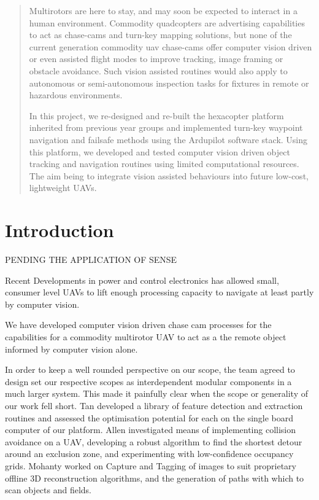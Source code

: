 \documentclass{article}
\begin{document}
  

  \begin{abstract}
  Multirotors are here to stay, and may soon be expected to interact in a human environment.
  Commodity quadcopters are advertising capabilities to act as  chase-cams and turn-key mapping solutions, but none of the current generation commodity uav chase-cams offer computer vision driven or even assisted flight modes to improve tracking, image framing or obstacle avoidance.  Such vision assisted routines would also apply to autonomous or semi-autonomous inspection tasks for fixtures in remote or hazardous environments.

  In this project, we re-designed and re-built the hexacopter platform inherited from previous year groups and implemented turn-key waypoint navigation and failsafe methods using the Ardupilot software stack.
  Using this platform, we developed and tested computer vision driven object tracking and navigation routines using limited computational resources. The aim  being to integrate vision assisted behaviours into future low-cost, lightweight UAVs.
  \end{abstract}
  \pagebreak
  \tableofcontents
  \pagebreak
  \section{Introduction}
    PENDING THE APPLICATION OF SENSE
    
    Recent Developments in power and control electronics has allowed small, consumer level UAVs to lift enough processing capacity to navigate at least partly by computer vision.


    We have developed computer vision driven chase cam processes for the 
     capabilities for a commodity multirotor UAV to act as a 
     the remote object informed by computer vision alone.

    In order to keep a well rounded perspective on our scope, the team agreed to design set our respective scopes as interdependent modular components in a much larger system.  This made it painfully clear when the scope or generality of our work fell short.
    Tan \cite{Tan} developed a library of feature detection and extraction routines and assessed the optimisation potential for each on the single board computer of our platform.
    Allen \cite{Allen} investigated means of implementing collision avoidance on a UAV, developing a robust algorithm to find the shortest detour around an exclusion zone, and experimenting with low-confidence occupancy grids.
    Mohanty \cite{Mohanty} worked on Capture and Tagging of images to suit proprietary offline 3D reconstruction algorithms, and the generation of paths with which to scan objects and fields.
\end{document}
